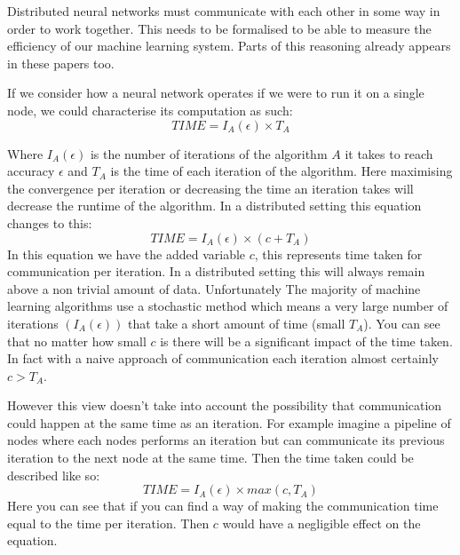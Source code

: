 Distributed neural networks must communicate with each other in some way in
order to work together. This needs to be formalised to be able to measure the
efficiency of our machine learning system. Parts of this reasoning already
appears in these papers too. \cite{konevcny2016federated ,Ma2017DistributedOptimisation}

If we consider how a neural network operates if we were to run it on a single
node, we could characterise its computation as such:
\begin{equation}
    TIME = I_A (\epsilon) \times T_A 
\end{equation}

Where \(I_A(\epsilon)\) is the number of iterations of the algorithm \(A\) it
takes to reach accuracy \(\epsilon\) and \(T_A\) is the time of each iteration
of the algorithm. Here maximising the convergence per iteration or decreasing
the time an iteration takes will decrease the runtime of the algorithm. In a
distributed setting this equation changes to this:
\begin{equation}
    TIME = I_A (\epsilon) \times (c + T_A)  
\end{equation}
In this equation we have the added variable \(c\), this represents time taken
for communication per iteration. In a distributed setting this will always
remain above a non trivial amount of data. Unfortunately The majority of machine
learning algorithms use a stochastic method which means a very large number of
iterations \((I_A(\epsilon))\) that take a short amount of time (small \(T_A\)).
You can see that no matter how small \(c\) is there will be a significant impact
of the time taken. In fact with a naive approach of communication each iteration
almost certainly \(c > T_A\).

However this view doesn't take into account the possibility that communication
could happen at the same time as an iteration. For example imagine a pipeline of
nodes where each nodes performs an iteration but can communicate its previous
iteration to the next node at the same time. Then the time taken could be
described like so:
\begin{equation}
    TIME = I_A (\epsilon) \times max(c, T_A)
\end{equation}
Here you can see that if you can find a way of making the communication time
equal to the time per iteration. Then \(c\) would have a negligible effect on
the equation.





